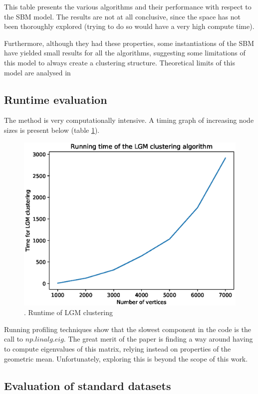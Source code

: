 \documentclass[11pt]{article}
\begin{document}
    This table presents the various algorithms and their performance with respect to 
  the SBM model. The results are not at all conclusive, since the space has not been 
  thoroughly explored (trying to do so would have a very high compute time). 

    Furthermore, although they had these properties, some instantiations of the 
  SBM have yielded small results for all the algorithms, suggesting some limitations
  of this model to always create a clustering structure. Theoretical limits of 
  this model are analysed in \cite{abbe2015community}

  \subsection{Runtime evaluation}
  
    The method is very computationally intensive. A timing graph of increasing 
  node sizes is present below (table \ref{fig:increasingn}).

  \begin{figure}[h!]
    \centering
      \includegraphics[width=0.5\columnwidth]{time1.eps}
      \caption{\label{fig:increasingn}. Runtime of LGM clustering}
  \end{figure}


    Running profiling techniques show that the slowest component in the code is 
  the call to $np.linalg.eig$. The great merit of the paper is finding a way 
  around having to compute eigenvalues of this matrix, relying instead on 
  properties of the geometric mean. Unfortunately, exploring this is 
  beyond the scope of this work.


  \subsection{Evaluation of standard datasets}
  \label{ev:std}
\end{document}
